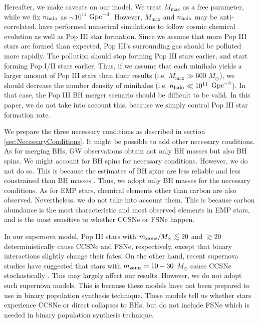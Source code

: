 \documentclass[pdftex]{pasj01}
\newcommand{\msun}{M_\odot}
\newcommand{\cgpc}{{\rm Gpc}^{-3}}
\newcommand{\mzams}{m_{\rm zams}}
\newcommand{\nhalo}{n_{\rm halo}}
\newcommand{\mlmax}{M_{\max}}
\begin{document}
Hereafter, we make caveats on our model. We treat $\mlmax$ as a free
parameter, while we fix $\nhalo$ as $\sim 10^{11}$ $\cgpc$. However,
$\mlmax$ and $\nhalo$ may be
anti-correlated. \citet{2020MNRAS.492.4386S} have performed numerical
simulations to follow cosmic chemical evolution as well as Pop III
star formation. Since we assume that more Pop III stars are formed
than \citet{2020MNRAS.492.4386S} expected, Pop III's surrounding gas
should be polluted more rapidly. The pollution should stop forming Pop
III stars earlier, and start forming Pop I/II stars earlier. Thus, if
we assume that each minihalo yields a larger amount of Pop III stars
than their results (i.e. $\mlmax \gg 600$ $\msun$), we should decrease
the number density of minihalos (i.e. $\nhalo \ll 10^{11}$
$\cgpc$). In that case, the Pop III BH merger scenario should be
difficult to be valid. In this paper, we do not take into account
this, because we simply control Pop III star formation rate.

We prepare the three necessary conditions as described in section
\ref{sec:NecessaryConditions}. It might be possible to add other
necessary conditions. As for merging BHs, GW observations obtain not
only BH masses but also BH spins. We might account for BH spins for
necessary conditions. However, we do not do so. This is because the
estimates of BH spins are less reliable and less constrained than BH
masses \citep{2021arXiv211103606T}. Thus, we adopt only BH masses for
the necessary conditions. As for EMP stars, chemical elements other
than carbon are also observed. Nevertheless, we do not take into
account them. This is because carbon abundance is the most
characteristic and most observed elements in EMP stars, and is the
most sensitive to whether CCSNe or FSNe happen.

In our supernova model, Pop III stars with $\mzams/\msun \lesssim 20$
and $\gtrsim 20$ deterministically cause CCSNe and FSNe, respectively,
except that binary interactions slightly change their fates. On the
other hand, recent supernova studies have suggested that stars with
$\mzams = 10-30$ $\msun$ cause CCSNe stochastically
\citep{2012ApJ...757...69U, 2015ApJ...801...90P, 2016ApJ...821...38S,
  2016MNRAS.460..742M, 2018ApJ...860...93S, 2021ApJ...909..169K}. This
may largely affect our results. However, we do not adopt such
supernova models. This is because these models have not been prepared
to use in binary population synthesis technique. These models tell us
whether stars experience CCSNe or direct collapses to BHs, but do not
include FSNe which is needed in binary population synthesis technique.
\end{document}

